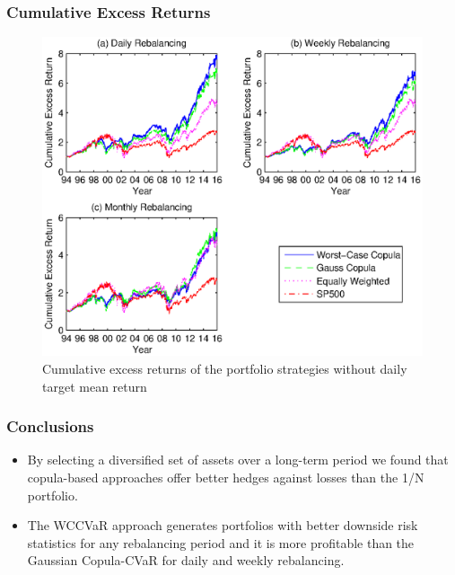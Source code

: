 \documentclass[pdf,10pt,xcolor=dvipsnames,hide notes]{beamer}
\begin{document}
\begin{frame}[label=frame10]
\frametitle{Cumulative Excess Returns}

\begin{figure}[htbp]
\centering
\includegraphics[scale=0.58]{fig1_nogrid.eps}
\caption{\scriptsize Cumulative excess returns of the portfolio strategies without daily target mean return }
\label{fig:fig01}
\end{figure}

\end{frame}

\begin{frame}[label=frame9d]
	\frametitle{Conclusions}
	
	\begin{itemize}
		\justifying
		
		\item By selecting a diversified set of assets over a long-term period we found that copula-based approaches offer better hedges against losses than the 1/N portfolio.
		
		\vspace{0.3cm}
		
		\item The WCCVaR approach generates portfolios with better downside
		risk statistics for any rebalancing period and it is more profitable than the Gaussian Copula-CVaR for daily and weekly rebalancing. 
		
		\end{itemize}
	
\end{frame}
		
\end{document}
